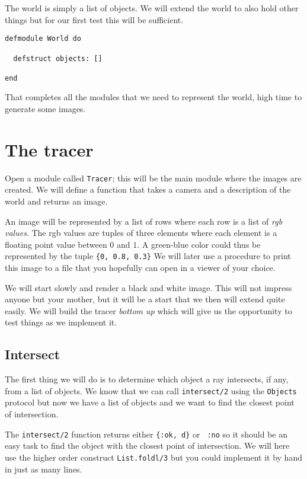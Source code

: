 \documentclass[a4paper,11pt]{article}
\begin{document}
The world is simply a list of objects. We will extend the world to also
hold other things but for our first test this will be sufficient.

\begin{verbatim}
defmodule World do

  defstruct objects: []

end
\end{verbatim}

That completes all the modules that we need to represent the world,
high time to generate some images.



\section{The tracer}

Open a module called {\tt Tracer}; this will be the main module where
the images are created. We will define a function that takes a camera
and a description of the world and returns an image.

An image will be represented by a list of rows where each row is a
list of {\em rgb values}. The rgb values are tuples of three elements
where each element is a floating point value between $0$ and $1$. A
green-blue color could thus be represented by the tuple {\tt \{0, 0.8,
  0.3\}} We will later use a procedure to print this image to a file
that you hopefully can open in a viewer of your choice.

We will start slowly and render a black and white image. This will not
impress anyone but your mother, but it will be a start that we then
will extend quite easily. We will build the tracer {\em bottom up}
which will give us the opportunity to test things as we implement
it. 

\subsection*{Intersect}

The first thing we will do is to determine which object a ray
intersects, if any, from a list of objects. We know that we can call
{\tt intersect/2} using the {\tt Objects} protocol but now we have a list
of objects and we want to find the closest point of intersection.

The {\tt intersect/2} function returns either {\tt \{:ok, d\}} or {\tt
  :no} so it should be an easy task to find the object with the closest
point of intersection. We will here use the higher order construct
{\tt List.foldl/3} but you could implement it by hand in just as many lines.
\end{document}
